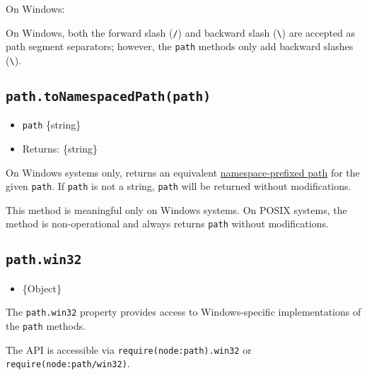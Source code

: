 On Windows:

\begin{Shaded}
\begin{Highlighting}[]
\SpecialCharTok{\textbackslash{}\textbackslash{}}\SpecialCharTok{\textbackslash{}\textbackslash{}}\NormalTok{)}\OperatorTok{;}
\end{Highlighting}
\end{Shaded}

On Windows, both the forward slash (\texttt{/}) and backward slash
(\texttt{\textbackslash{}}) are accepted as path segment separators;
however, the \texttt{path} methods only add backward slashes
(\texttt{\textbackslash{}}).

\subsection{\texorpdfstring{\texttt{path.toNamespacedPath(path)}}{path.toNamespacedPath(path)}}\label{path.tonamespacedpathpath}

\begin{itemize}
\tightlist
\item
  \texttt{path} \{string\}
\item
  Returns: \{string\}
\end{itemize}

On Windows systems only, returns an equivalent
\href{https://docs.microsoft.com/en-us/windows/desktop/FileIO/naming-a-file\#namespaces}{namespace-prefixed
path} for the given \texttt{path}. If \texttt{path} is not a string,
\texttt{path} will be returned without modifications.

This method is meaningful only on Windows systems. On POSIX systems, the
method is non-operational and always returns \texttt{path} without
modifications.

\subsection{\texorpdfstring{\texttt{path.win32}}{path.win32}}\label{path.win32}

\begin{itemize}
\tightlist
\item
  \{Object\}
\end{itemize}

The \texttt{path.win32} property provides access to Windows-specific
implementations of the \texttt{path} methods.

The API is accessible via
\texttt{require(\textquotesingle{}node:path\textquotesingle{}).win32} or
\texttt{require(\textquotesingle{}node:path/win32\textquotesingle{})}.
